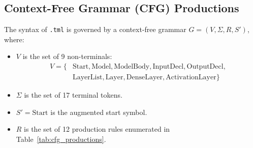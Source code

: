 \documentclass[11pt,a4paper]{article}
\begin{document}
\subsection{Context-Free Grammar (CFG) Productions}
The syntax of \texttt{.tml} is governed by a context-free grammar $G = (V, \Sigma, R, S')$, where:
\begin{itemize}
    \item $V$ is the set of 9 non-terminals:
    \begin{align*}
        V = \{ &\text{Start}, \text{Model}, \text{ModelBody}, \text{InputDecl}, \text{OutputDecl}, \\
               &\text{LayerList}, \text{Layer}, \text{DenseLayer}, \text{ActivationLayer} \}
    \end{align*}
    \item $\Sigma$ is the set of 17 terminal tokens.
    \item $S' = \text{Start}$ is the augmented start symbol.
    \item $R$ is the set of 12 production rules enumerated in Table~\ref{tab:cfg_productions}.
\end{itemize}
\end{document}
